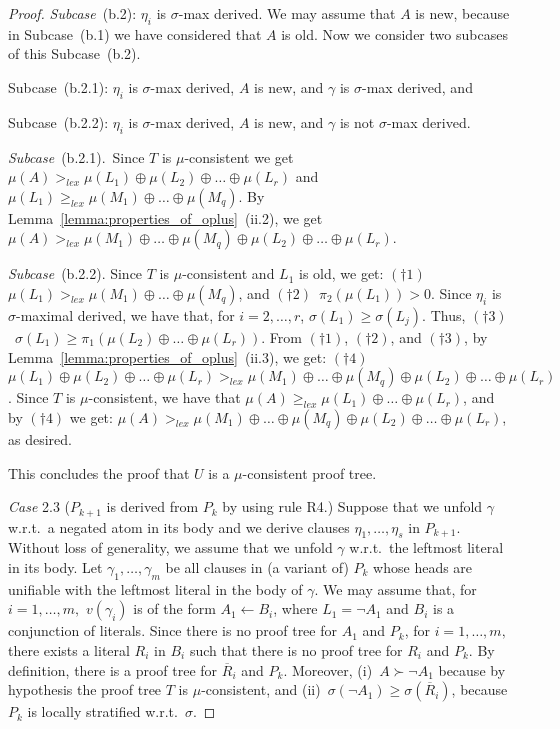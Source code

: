 \documentclass[english]{tlp}
\newcommand{\If}{\leftarrow}
\renewcommand{\mathit}{\displaystyle}
\begin{document}
\begin{proof}
{\emph{Subcase}}~(b.2): 
$\eta_i$ is $\sigma$-max derived. We may assume that $A$ is new, 
because in Subcase~(b.1) we have considered that $A$ is old. 
Now we consider two subcases of this Subcase~(b.2).  

\noindent
Subcase~(b.2.1):  $\eta_i$ is $\sigma$-max derived, $A$ is new, and $\gamma$ is $\sigma$-max derived, and 

\noindent
Subcase~(b.2.2):
$\eta_i$ is $\sigma$-max derived, $A$ is new,  and $\gamma$ is not $\sigma$-max derived.

\noindent
{\it{Subcase}}~(b.2.1).~Since $T$ is $\mu$-consistent
we get $\mu(A)>_{\mathit{lex}} \mu(L_1) \oplus \mu(L_2) \oplus 
\ldots  \oplus \mu(L_r)$ and
 $\mu(L_1)\geq_{\mathit{lex}} \mu(M_1) \oplus 
\ldots  \oplus \mu(M_q)$. By
Lemma~\ref{lemma:properties_of_oplus}~(ii.2), we get
$\mu(A)>_{\mathit{lex}} \mu(M_1) \oplus 
\ldots  \oplus \mu(M_q) \oplus \mu(L_2) \oplus 
\ldots  \oplus \mu(L_r)$.


\noindent
{\it{Subcase}}~(b.2.2). Since $T$ is $\mu$-consistent and $L_1$ is old, we get:
$(\dagger 1)$~$\mu(L_1)>_{\mathit{lex}}\mu(M_1)\oplus\ldots \oplus \mu(M_q)$, and  $(\dagger 2)$~$\pi_2(\mu(L_1))>0$.
Since $\eta_i$ is $\sigma$-maximal
derived, we have that, for $i\!=\!2,\ldots,r$, 
$\sigma(L_1)\!\geq\!\sigma(L_j)$. Thus,
$(\dagger 3)$~$\sigma(L_1)\geq\pi_1(\mu(L_2)\oplus\ldots \oplus \mu(L_r))$. From $(\dagger 1)$, $(\dagger 2)$, and $(\dagger 3)$, 
by Lemma~\ref{lemma:properties_of_oplus}~(ii.3), we get:
$(\dagger 4)$
$\mu(L_1) \oplus \mu(L_2)\oplus\ldots \oplus \mu(L_r)>_{\mathit{lex}}\mu(M_1)\oplus\ldots \oplus \mu(M_q)
\oplus \mu(L_2)\oplus\ldots \oplus \mu(L_r)$. Since
 $T$ is $\mu$-consistent, we have that 
 $\mu(A)\geq_{\mathit{lex}}\mu(L_1)\oplus\ldots \oplus \mu(L_r)$, and
 by $(\dagger 4)$ we get:  
 $\mu(A)>_{\mathit{lex}} \mu(M_1)\oplus\ldots \oplus \mu(M_q)
\oplus \mu(L_2)\oplus\ldots \oplus \mu(L_r)$,
 as desired.

This concludes the proof that $U$ is a $\mu$-consistent
proof tree.

\medskip 

\noindent \emph{Case} 2.3 ($P_{k+1}$ is derived from $P_k$ by using
rule R4.) Suppose that we unfold $\gamma$ w.r.t.~a negated atom in
its body and we derive clauses $\eta_1,\ldots,\eta_s$ in $P_{k+1}$.
Without loss of generality, we assume that we unfold $\gamma$
w.r.t.~the leftmost literal in its body. Let $\gamma_1, \ldots,
\gamma_m$  be all clauses in (a variant of) $P_k$ whose heads are
unifiable with the leftmost literal in the body of $\gamma$. We may
assume that, for $i=1,\ldots,m,$ $v(\gamma_i)$ is of the form $A_1
\If B_i$, where $L_1 = \neg A_1$ and $B_i$ is a conjunction of
literals. Since there is no proof tree for $A_1$ and $P_k$, for
$i=1,\ldots,m,$ there exists a literal $R_i$ in $B_i$ such that
there is no proof tree for $R_i$ and $P_k$. By definition,
there is a proof tree for $\overline R_i$ and $P_k$. 
Moreover, (i)~$A
\succ \neg A_1$  because by hypothesis the proof tree $T$ is
$\mu$-consistent, and (ii)~$\sigma(\neg A_1) \geq \sigma(\overline R_i)$,
because $P_k$ is locally stratified w.r.t.~$\sigma$. 


\end{proof}
\end{document}
